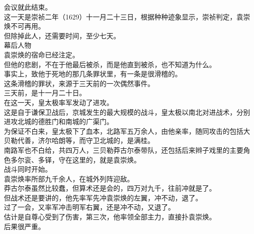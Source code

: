 \begin{multicols}{\theparacolNo}
会议就此结束。\\

这一天是崇祯二年（1629）十一月二十三日，根据种种迹象显示，崇祯判定，袁崇焕不可再用。\\

但除掉此人，还需要时间，至少七天。\\

幕后人物\\

袁崇焕的宿命已经注定。\\

但他的悲剧，不在于他最后被杀，而是他直到被杀，也不知道为什么。\\

事实上，致他于死地的那几条罪状里，有一条是很滑稽的。\\

这条滑稽的罪状，来源于三天前的一次偶然事件。\\

三天前，是十一月二十日。\\

在这一天，皇太极率军发动了进攻。\\

这是自于谦保卫战后，京城发生的最大规模的战斗，皇太极以南北对进战术，分别进攻北城的德胜门和南城的广渠门。\\

为保证不白来，皇太极下了血本，北路军五万余人，由他亲率，随同攻击的包括大贝勒代善，济尔哈朗等，而守卫北城的，是满桂。\\

南路军也不白给，共四万人，三贝勒莽古尔泰带队，还包括后来辫子戏里的主要角色多尔衮、多铎，守在这里的，就是袁崇焕。\\

战斗同时开始。\\

袁崇焕率所部九千余人，在城外列阵迎敌。\\

莽古尔泰虽然比较蠢，但算术还是会的，四万对九千，往前冲就是了。\\

但战术还是要讲的，他先率军先冲袁崇焕的左翼，冲不动，退了。\\

过了一会，又率军冲击明军右翼，还是冲不动，又退了。\\

估计是自尊心受到了伤害，第三次，他率领全部主力，直接扑袁崇焕。\\

后果很严重。\\


\end{multicols}
